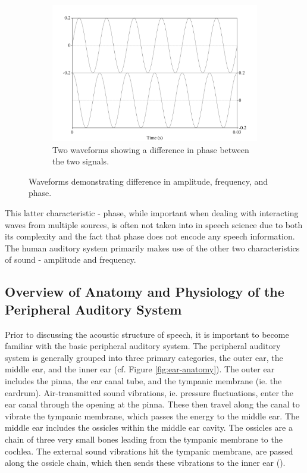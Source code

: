\begin{figure}[h!]
\begin{center}
\begin{subfigure}{0.5\textwidth}
  \includegraphics[width=\textwidth]{figure/basic-sound-phase.png}
  \caption{Two waveforms showing a difference in phase between the two signals.}
  \label{fig:basic-sound-phase}
\end{subfigure}
\end{center}
\caption{Waveforms demonstrating difference in amplitude, frequency, and phase.}
\label{fig:basic-sound-wave}
\end{figure}

This latter characteristic - phase, while important when dealing with interacting waves from multiple sources, is often not taken into in speech science due to both its complexity and the fact that phase does not encode any speech information.  The human auditory system primarily makes use of the other two characteristics of sound - amplitude and frequency.

\subsection{Overview of Anatomy and Physiology of the Peripheral Auditory System}

Prior to discussing the acoustic structure of speech, it is important to become familiar with the basic peripheral auditory system.  The peripheral auditory system is generally grouped into three primary categories, the outer ear, the middle ear, and the inner ear (cf. Figure \ref{fig:ear-anatomy}).  The outer ear includes the pinna, the ear canal tube, and the tympanic membrane (ie. the eardrum).  Air-transmitted sound vibrations, ie. pressure fluctuations, enter the ear canal through the opening at the pinna.  These then travel along the canal to vibrate the tympanic membrane, which passes the energy to the middle ear.  The middle ear includes the ossicles within the middle ear cavity.  The ossicles are a chain of three very small bones leading from the tympanic membrane to the cochlea. The external sound vibrations hit the tympanic membrane, are passed along the ossicle chain, which then sends these vibrations to the inner ear (\cite{rosen:91}).

